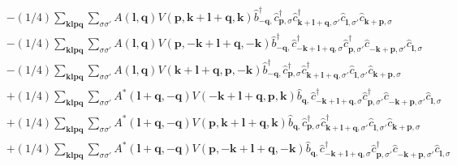 \begin{align*}
	&-(1/4) \sum_{ \mathbf{k} \mathbf{l} \mathbf{p} \mathbf{q} } \sum_{ \sigma \sigma' } A( \mathbf{l}, \mathbf{q} )  V( \mathbf{p}, \mathbf{k}+\mathbf{l}+\mathbf{q}, \mathbf{k} )   \hat{b}_{ -\mathbf{q}, }^\dagger  \hat{c}_{ \mathbf{p}, \sigma }^\dagger  \hat{c}_{ \mathbf{k}+\mathbf{l}+\mathbf{q}, \sigma' }^\dagger  \hat{c}_{ \mathbf{l}, \sigma' }^{\phantom{\dagger}} \hat{c}_{ \mathbf{k}+\mathbf{p}, \sigma }^{\phantom{\dagger}}  \\
	&-(1/4) \sum_{ \mathbf{k} \mathbf{l} \mathbf{p} \mathbf{q} } \sum_{ \sigma \sigma' } A( \mathbf{l}, \mathbf{q} )  V( \mathbf{p}, -\mathbf{k}+\mathbf{l}+\mathbf{q}, -\mathbf{k} )   \hat{b}_{ -\mathbf{q}, }^\dagger  \hat{c}_{ -\mathbf{k}+\mathbf{l}+\mathbf{q}, \sigma }^\dagger  \hat{c}_{ \mathbf{p}, \sigma' }^\dagger  \hat{c}_{ -\mathbf{k}+\mathbf{p}, \sigma' }^{\phantom{\dagger}} \hat{c}_{ \mathbf{l}, \sigma }^{\phantom{\dagger}}  \\
	&-(1/4) \sum_{ \mathbf{k} \mathbf{l} \mathbf{p} \mathbf{q} } \sum_{ \sigma \sigma' } A( \mathbf{l}, \mathbf{q} )  V( \mathbf{k}+\mathbf{l}+\mathbf{q}, \mathbf{p}, -\mathbf{k} )   \hat{b}_{ -\mathbf{q}, }^\dagger  \hat{c}_{ \mathbf{p}, \sigma }^\dagger  \hat{c}_{ \mathbf{k}+\mathbf{l}+\mathbf{q}, \sigma' }^\dagger  \hat{c}_{ \mathbf{l}, \sigma' }^{\phantom{\dagger}} \hat{c}_{ \mathbf{k}+\mathbf{p}, \sigma }^{\phantom{\dagger}}  \\
	&+(1/4) \sum_{ \mathbf{k} \mathbf{l} \mathbf{p} \mathbf{q} } \sum_{ \sigma \sigma' } A^*( \mathbf{l}+\mathbf{q}, -\mathbf{q} )  V( -\mathbf{k}+\mathbf{l}+\mathbf{q}, \mathbf{p}, \mathbf{k} )   \hat{b}_{ \mathbf{q}, }^{\phantom{\dagger}} \hat{c}_{ -\mathbf{k}+\mathbf{l}+\mathbf{q}, \sigma }^\dagger  \hat{c}_{ \mathbf{p}, \sigma' }^\dagger  \hat{c}_{ -\mathbf{k}+\mathbf{p}, \sigma' }^{\phantom{\dagger}} \hat{c}_{ \mathbf{l}, \sigma }^{\phantom{\dagger}}  \\
	&+(1/4) \sum_{ \mathbf{k} \mathbf{l} \mathbf{p} \mathbf{q} } \sum_{ \sigma \sigma' } A^*( \mathbf{l}+\mathbf{q}, -\mathbf{q} )  V( \mathbf{p}, \mathbf{k}+\mathbf{l}+\mathbf{q}, \mathbf{k} )   \hat{b}_{ \mathbf{q}, }^{\phantom{\dagger}} \hat{c}_{ \mathbf{p}, \sigma }^\dagger  \hat{c}_{ \mathbf{k}+\mathbf{l}+\mathbf{q}, \sigma' }^\dagger  \hat{c}_{ \mathbf{l}, \sigma' }^{\phantom{\dagger}} \hat{c}_{ \mathbf{k}+\mathbf{p}, \sigma }^{\phantom{\dagger}}  \\
	&+(1/4) \sum_{ \mathbf{k} \mathbf{l} \mathbf{p} \mathbf{q} } \sum_{ \sigma \sigma' } A^*( \mathbf{l}+\mathbf{q}, -\mathbf{q} )  V( \mathbf{p}, -\mathbf{k}+\mathbf{l}+\mathbf{q}, -\mathbf{k} )   \hat{b}_{ \mathbf{q}, }^{\phantom{\dagger}} \hat{c}_{ -\mathbf{k}+\mathbf{l}+\mathbf{q}, \sigma }^\dagger  \hat{c}_{ \mathbf{p}, \sigma' }^\dagger  \hat{c}_{ -\mathbf{k}+\mathbf{p}, \sigma' }^{\phantom{\dagger}} \hat{c}_{ \mathbf{l}, \sigma }^{\phantom{\dagger}}  \\

\end{align*}
